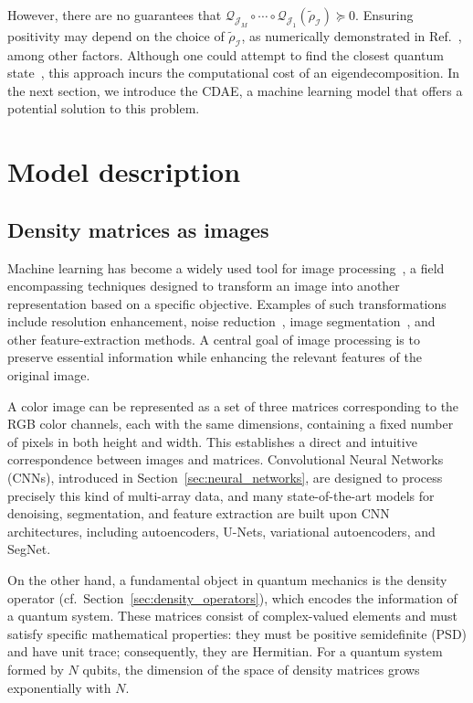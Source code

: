 However, there are no guarantees that $\mathcal{Q}_{\mathcal{J}_M} \circ \cdots \circ \mathcal{Q}_{\mathcal{J}_1}(\tilde{\rho}_{\mathcal{I}}) \succeq 0$. Ensuring positivity may depend on the choice of $\tilde{\rho}_{\mathcal{I}}$, as numerically demonstrated in Ref.~\cite{uzcategui2022mio}, among other factors. Although one could attempt to find the closest quantum state~\cite{guta2020}, this approach incurs the computational cost of an eigendecomposition. In the next section, we introduce the CDAE, a machine learning model that offers a potential solution to this problem.

\section{Model description}
\label{sec:qmp-model}

\subsection{Density matrices as images}
\label{sec:qmp-images}

Machine learning has become a widely used tool for image processing~\cite{wang2019imaging}, a field encompassing techniques designed to transform an image into another representation based on a specific objective. Examples of such transformations include resolution enhancement, noise reduction~\cite{scattarella2023}, image segmentation~\cite{suganyadevi2022}, and other feature-extraction methods. A central goal of image processing is to preserve essential information while enhancing the relevant features of the original image.

A color image can be represented as a set of three matrices corresponding to the RGB color channels, each with the same dimensions, containing a fixed number of pixels in both height and width. This establishes a direct and intuitive correspondence between images and matrices. Convolutional Neural Networks (CNNs), introduced in Section~\ref{sec:neural_networks}, are designed to process precisely this kind of multi-array data, and many state-of-the-art models for denoising, segmentation, and feature extraction are built upon CNN architectures, including autoencoders, U-Nets, variational autoencoders, and SegNet.

On the other hand, a fundamental object in quantum mechanics is the density operator (cf.~Section~\ref{sec:density_operators}), which encodes the information of a quantum system. These matrices consist of complex-valued elements and must satisfy specific mathematical properties: they must be positive semidefinite (PSD) and have unit trace; consequently, they are Hermitian. For a quantum system formed by $N$ qubits, the dimension of the space of density matrices grows exponentially with $N$.

